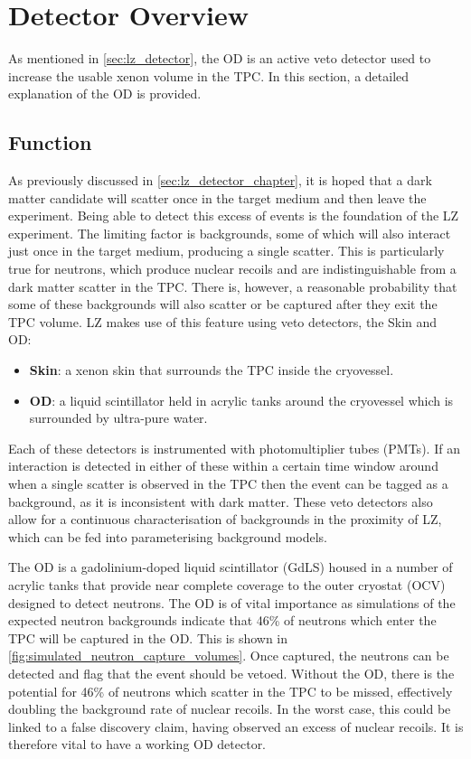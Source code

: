 \section{Detector Overview} \label{OD_detector_overview}
\par
As mentioned in \autoref{sec:lz_detector}, the OD is an active veto detector used to increase the usable xenon volume in the TPC.
In this section, a detailed explanation of the OD is provided.

\subsection{Function}
\par
As previously discussed in \autoref{sec:lz_detector_chapter}, it is hoped that a dark matter candidate will scatter once in the target medium and then leave the experiment.
Being able to detect this excess of events is the foundation of the LZ experiment.
The limiting factor is backgrounds, some of which will also interact just once in the target medium, producing a single scatter.
This is particularly true for neutrons, which produce nuclear recoils and are indistinguishable from a dark matter scatter in the TPC.
There is, however, a reasonable probability that some of these backgrounds will also scatter or be captured after they exit the TPC volume.
LZ makes use of this feature using veto detectors, the Skin and OD:
\begin{itemize}
    \item \textbf{Skin}: a xenon skin that surrounds the TPC inside the cryovessel.
    \item \textbf{OD}: a liquid scintillator held in acrylic tanks around the cryovessel which is surrounded by ultra-pure water.
\end{itemize}
Each of these detectors is instrumented with photomultiplier tubes (PMTs).
If an interaction is detected in either of these within a certain time window around when a single scatter is observed in the TPC then the event can be tagged as a background, as it is inconsistent with dark matter.
These veto detectors also allow for a continuous characterisation of backgrounds in the proximity of LZ, which can be fed into parameterising background models.

\par
The OD is a gadolinium-doped liquid scintillator (GdLS) housed in a number of acrylic tanks that provide near complete coverage to the outer cryostat (OCV) designed to detect neutrons.
The OD is of vital importance as simulations of the expected neutron backgrounds indicate that 46\% of neutrons which enter the TPC will be captured in the OD.
This is shown in \autoref{fig:simulated_neutron_capture_volumes}.
Once captured, the neutrons can be detected and flag that the event should be vetoed. 
Without the OD, there is the potential for 46\% of neutrons which scatter in the TPC to be missed, effectively doubling the background rate of nuclear recoils.
In the worst case, this could be linked to a false discovery claim, having observed an excess of nuclear recoils.
It is therefore vital to have a working OD detector.

